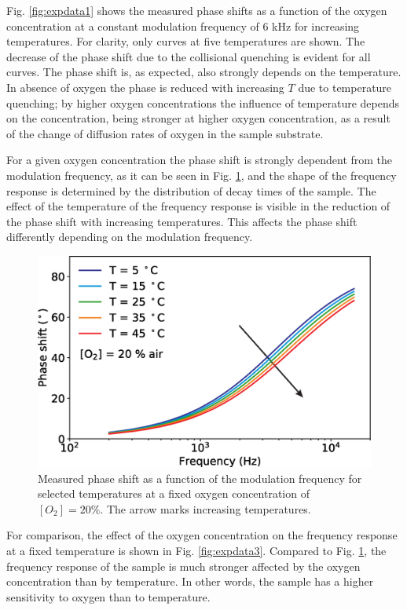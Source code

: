 \documentclass[9pt,twocolumn,twoside,pdftex]{optica}
\begin{document}
Fig. \ref{fig:expdata1} shows the measured phase shifts as a function of the oxygen concentration at a constant modulation frequency of 6 kHz for increasing temperatures. For clarity, only curves at five temperatures are shown. The decrease of the phase shift due to the collisional quenching is evident for all curves. The phase shift is, as expected, also strongly depends on the temperature. In absence of oxygen the phase is reduced with increasing $T$ due to temperature quenching; by higher oxygen concentrations the influence of temperature depends on the concentration, being stronger at higher oxygen concentration, as a result of the change of diffusion rates of oxygen in the sample substrate.

For a given oxygen concentration the phase shift is strongly dependent from the modulation frequency, as it can be seen in Fig. \ref{fig:expdata2}, and the shape of the frequency response is determined by the distribution of decay times of the sample. The effect of the temperature of the frequency response is visible in the reduction of the phase shift with increasing temperatures. This affects the phase shift differently depending on the modulation frequency. 

\begin{figure}[t!]
\centering
\includegraphics[width=8.2 cm]{phase_f_T.eps}
\caption{Measured phase shift as a function of the modulation frequency for selected temperatures at a fixed oxygen concentration of $[O_2]=20 \%$. The arrow marks increasing temperatures.}
\label{fig:expdata2}
\end{figure}

For comparison, the effect of the oxygen concentration on the frequency response at a fixed temperature is shown in Fig. \ref{fig:expdata3}. Compared to Fig. \ref{fig:expdata2}, the frequency response of the sample is much stronger affected by the oxygen concentration than by temperature. In other words, the sample has a higher sensitivity to oxygen than to temperature.
\end{document}
